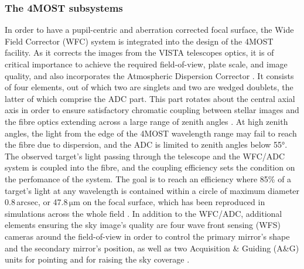 \documentclass[a4paper,11pt]{article}
\begin{document}
\subsubsection{The 4MOST subsystems} \label{subsystems}
In order to have a pupil-centric and aberration corrected focal surface, the Wide Field Corrector (WFC) system is integrated into the design of the 4MOST facility. As it corrects the images from the VISTA telescopes optics, it is of critical importance to achieve the required field-of-view, plate scale, and image quality, and also incorporates the Atmospheric Dispersion Corrector \citep[ADC;][]{cunningham23}. It consists of four elements, out of which two are singlets and two are wedged doublets, the latter of which comprise the ADC part. This part rotates about the central axial axis in order to ensure satisfactory chromatic coupling between stellar images and the fibre optics extending across a large range of zenith angles \citep{azais16}. At high zenith angles, the light from the edge of the 4MOST wavelength range may fail to reach the fibre due to dispersion, and the ADC is limited to zenith angles below 55°. The observed target's light passing through the telescope and the WFC/ADC system is coupled into the fibre, and the coupling efficiency sets the condition on the perfomance of the system. The goal is to reach an efficiency where 85\% of a target's light at any wavelength is contained within a circle of maximum diameter 0.8\,arcsec, or 47.8\,$\mathrm{\mu m}$ on the focal surface, which has been reproduced in simulations across the whole field \citep{4most16,azais16}. In addition to the WFC/ADC, additional elements ensuring the sky image's quality are four wave front sensing (WFS) cameras around the field-of-view in order to control the primary mirror's shape and the secondary mirror's position, as well as two Acquisition \& Guiding (A\&G) units for pointing and for raising the sky coverage \citep[][\href{https://www.4most.eu/cms/files/VIS-MAN-4MOST-47110-9800-0001_2_00-4MOST-User-Manual.pdf}{4MOST User Manual}]{4most16}.
%
\end{document}
